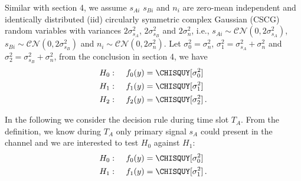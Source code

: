 Similar with section 4, we assume  $s_{Ai}$ $s_{Bi}$ and $n_i$ are zero-mean independent and identically distributed (iid) circularly symmetric complex Gaussian (CSCG) random variables with variances $2\sigma_{s_A}^2$, $2\sigma_{s_B}^2$ and $2\sigma_{n}^2$, i.e., $s_{Ai} \sim \mathcal{CN}(0, 2\sigma_{s_A}^2)$, $s_{Bi} \sim \mathcal{CN}(0, 2\sigma_{s_B}^2)$ and $n_i \sim \mathcal{CN}(0, 2\sigma_{n}^2)$. Let $\sigma_0^2 = \sigma_n^2$, $\sigma_1^2 = \sigma_{s_A}^2 + \sigma_n^2$ and $\sigma_2^2 = \sigma_{s_B}^2 + \sigma_n^2$, from the conclusion in section 4, we have
\begin{equation}
  \label{20150627a2}
  \begin{split}
    H_0:\;\;\;\;\;&f_0(y) = \CHISQUY[\sigma_0^2]\\
    H_1:\;\;\;\;\;&f_{1}(y) = \CHISQUY[\sigma_1^2]\\
    H_2:\;\;\;\;\;&f_{2}(y) = \CHISQUY[\sigma_2^2]\,.
  \end{split}
\end{equation}

In the following we consider the decision rule during time slot $T_A$. From the definition, we know during $T_A$ only primary signal $s_A$ could present in the channel and we are interested to test $H_0$ against $H_1$:
\begin{equation}
  \begin{split}
    H_0:\;\;\;\;\;&f_0(y) = \CHISQUY[\sigma_0^2]\\
    H_1:\;\;\;\;\;&f_{1}(y) = \CHISQUY[\sigma_1^2]\,.
  \end{split}
  \label{20150621a8}
\end{equation}

